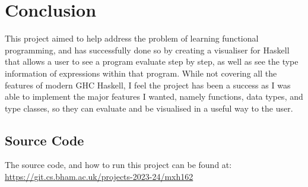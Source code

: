 \section{Conclusion} \label{conclusion}
This project aimed to help address the problem of learning functional programming, and has successfully done so by creating a visualiser for Haskell that allows a user to see a program evaluate step by step, as well as see the type information of expressions within that program. While not covering all the features of modern GHC Haskell, I feel the project has been a success as I was able to implement the major features I wanted, namely functions, data types, and type classes, so they can evaluate and be visualised in a useful way to the user.

\vfill{}
\subsection*{Source Code}
The source code, and how to run this project can be found at:
\\\href{https://git.cs.bham.ac.uk/projects-2023-24/mxh162}{https://git.cs.bham.ac.uk/projects-2023-24/mxh162}